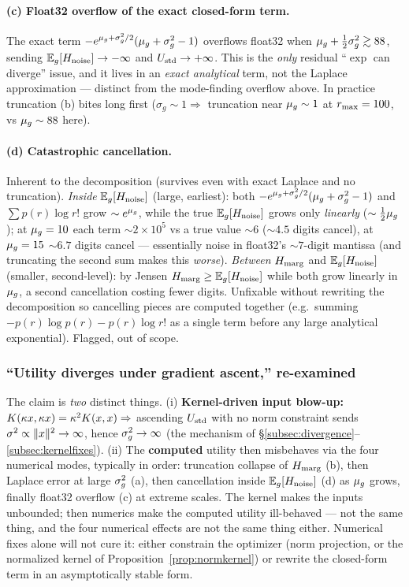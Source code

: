 \paragraph{(c) Float32 overflow of the exact closed-form term.} The exact term
$-e^{\mu_{g}+\sigma_{g}^{2}/2}(\mu_{g}+\sigma_{g}^{2}-1)$ overflows float32 when
$\mu_{g}+\tfrac12\sigma_{g}^{2}\gtrsim88$, sending $\mathbb{E}_{g}[H_{\mathrm{noise}}]\to-\infty$ and
$U_{\mathrm{std}}\to+\infty$. This is the \emph{only} residual ``$\exp$ can diverge'' issue,
and it lives in an \emph{exact analytical} term, not the Laplace approximation ---
distinct from the mode-finding overflow above. In practice truncation (b) bites
long first ($\sigma_g\sim1\Rightarrow$ truncation near $\mu_{g}\sim1$ at $r_{\max}=100$, vs
$\mu_{g}\sim88$ here).

\paragraph{(d) Catastrophic cancellation.} Inherent to the decomposition (survives
even with exact Laplace and no truncation). \emph{Inside} $\mathbb{E}_{g}[H_{\mathrm{noise}}]$
(large, earliest): both $-e^{\mu_{g}+\sigma_{g}^{2}/2}(\mu_{g}+\sigma_{g}^{2}-1)$ and $\sum p(r)\log r!$
grow $\sim e^{\mu_{g}}$, while the true $\mathbb{E}_{g}[H_{\mathrm{noise}}]$ grows only \emph{linearly}
($\sim\tfrac12\mu_{g}$); at $\mu_{g}=10$ each term $\sim2\times10^5$ vs a true value
$\sim6$ ($\sim4.5$ digits cancel), at $\mu_{g}=15$ $\sim6.7$ digits cancel ---
essentially noise in float32's $\sim7$-digit mantissa (and truncating the second
sum makes this \emph{worse}). \emph{Between} $H_{\mathrm{marg}}$ and $\mathbb{E}_{g}[H_{\mathrm{noise}}]$
(smaller, second-level): by Jensen $H_{\mathrm{marg}}\ge\mathbb{E}_{g}[H_{\mathrm{noise}}]$ while both grow
linearly in $\mu_{g}$, a second cancellation costing fewer digits. Unfixable without
rewriting the decomposition so cancelling pieces are computed together (e.g.\
summing $-p(r)\log p(r)-p(r)\log r!$ as a single term before any large analytical
exponential). Flagged, out of scope.

\subsubsection{``Utility diverges under gradient ascent,'' re-examined}
The claim is \emph{two} distinct things. (i) \textbf{Kernel-driven input blow-up:}
$K(\kappa x,\kappa x)=\kappa^2K(x,x)\Rightarrow$ ascending $U_{\mathrm{std}}$ with no norm
constraint sends $\sigma^{2}\propto\lVert x\rVert^2\to\infty$, hence $\sigma_{g}^{2}\to\infty$
(the mechanism of \S\ref{subsec:divergence}--\ref{subsec:kernelfixes}). (ii) The
\textbf{computed} utility then misbehaves via the four numerical modes, typically
in order: truncation collapse of $H_{\mathrm{marg}}$ (b), then Laplace error at large $\sigma_{g}^{2}$
(a), then cancellation inside $\mathbb{E}_{g}[H_{\mathrm{noise}}]$ (d) as $\mu_{g}$ grows, finally
float32 overflow (c) at extreme scales. The kernel makes the inputs unbounded;
then numerics make the computed utility ill-behaved --- not the same thing, and
the four numerical effects are not the same thing either. Numerical fixes alone
will not cure it: either constrain the optimizer (norm projection, or the
normalized kernel of Proposition~\ref{prop:normkernel}) or rewrite the closed-form
term in an asymptotically stable form.

